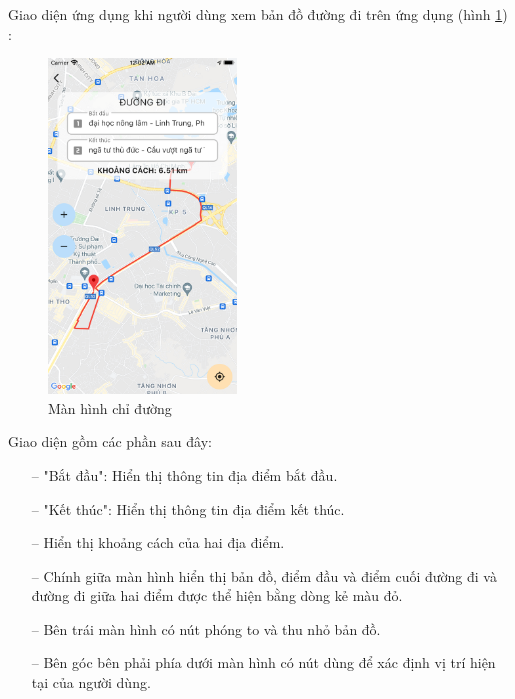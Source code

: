 Giao diện ứng dụng khi người dùng xem bản đồ đường đi trên ứng dụng (hình \ref{fig:screen-map}) :
\begin{figure}[H]
    \centering
    \includegraphics[width=5cm]{images/Screen-Map.png}
    \caption{Màn hình chỉ đường}
    \label{fig:screen-map}
\end{figure}

Giao diện gồm các phần sau đây:
\begin{itemize}
    \item[--] "Bắt đầu": Hiển thị thông tin địa điểm bắt đầu.
    \item[--] "Kết thúc": Hiển thị thông tin địa điểm kết thúc.
    \item[--] Hiển thị khoảng cách của hai địa điểm.
    \item[--] Chính giữa màn hình hiển thị bản đồ, điểm đầu và điểm cuối đường đi và đường đi giữa hai điểm được thể hiện bằng dòng kẻ màu đỏ.
    \item[--] Bên trái màn hình có nút phóng to và thu nhỏ bản đồ.
    \item[--] Bên góc bên phải phía dưới màn hình có nút dùng để xác định vị trí hiện tại của người dùng.
\end{itemize}